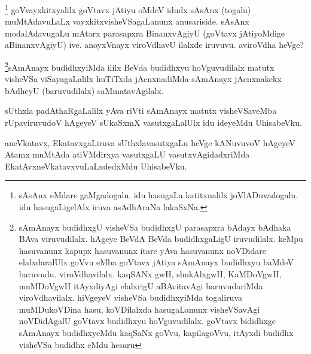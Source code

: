 
\begin{artha}
\footnote{sAsAnx eMdare gaMgadogalu. idu hasugaLa katitxnalilx joVlADuvadogalu. idu hasugaLigelAlx iruva asAdhAraNa lakaSxNa.}
goVvayxkitxyalilx goVtavx jAtiyu oMdeV idudx sAsAnx (togalu) muMtAdavuLaLx vayxkitxvisheVSagaLanunx anusariside. sAsAnx modalAdavugaLu mAtarx parasapxra BinanxvAgiyU (goVtavx jAtiyoMdige aBinanxvAgiyU) ive. anoyxVnayx viroVdhavU ilalxde iruvuvu. aviroVdha heVge?
\end{artha}

\begin{artha}
\footnote{sAmAnayx budidhxgU visheVSa budidhxgU parasapxra bAdayx bAdhaka BAva viruvudilalx. hAgeye BeVdA BeVda budidhxgaLigU iruvudilalx. keMpu hasuvanunx kapupx hasuvanunx itare yAva hasuvanunx noVDidare elalxdaralUlx goVvu eMba goVtavx jAtiya sAmAnayx budidhxyu baMdeV baruvudu. viroVdhavilalx. kaqSANx gwH, shukAlxgwH, KaMDoVgwH, muMDoVgwH itAyxdiyAgi elalxrigU aBAvitavAgi baruvudariMda viroVdhavilalx. hiVgeyeV visheVSa budidhxyiMda togaliruva muMDukoVDina hasu, koVDilalxda hasugaLanunx visheVSavAgi noVDidAgalU goVtavx budidhxyu hoVguvudilalx. goVtavx bididhxge sAmAnayx budidhxyeMdu kaqSaNx goVvu, kapilagoVvu, itAyxdi budidhx visheVSa budidhx eMdu hesaru}sAmAnayx budidhxyiMda ililx BeVda budidhxyu hoVguvudilalx matutx visheVSa viSayagaLalilx huTiTxda jAcnxnadiMda sAmAnayx jAcnxnakekx bAdheyU (baruvudilalx) saMmatavAgilalx.
\end{artha}


\begin{artha}
sUthxla padAthaRgaLalilx yAva riVti sAmAnayx matutx visheVSaveMba rUpaviruvudoV hAgeyeV sUkaSxmX vasutxgaLalUlx idu ideyeMdu UhisabeVku.
\end{artha}


\begin{artha}
aneVkatavx, EkatavxgaLiruva sUthxlavasutxgaLu heVge kANuvuvoV hAgeyeV Atamx muMtAda atiVMdirxya vasutxgaLU vasutxvAgidadxriMda EkatAvxneVkatavxvuLaLxdedxMdu UhisabeVku.
\end{artha}

